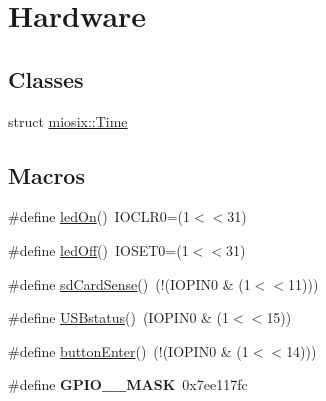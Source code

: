 \hypertarget{group___hardware}{\section{Hardware}
\label{group___hardware}
}
\subsection*{Classes}
\begin{DoxyCompactItemize}
\item 
struct \hyperlink{structmiosix_1_1_time}{miosix\-::\-Time}
\end{DoxyCompactItemize}
\subsection*{Macros}
\begin{DoxyCompactItemize}
\item 
\#define \hyperlink{group___hardware_ga7f802fb8b3e2bd4b837c798cb7baaede}{led\-On}()~I\-O\-C\-L\-R0=(1$<$$<$31)
\item 
\#define \hyperlink{group___hardware_ga53f74cd6a7d5774ef20ab95fcea03092}{led\-Off}()~I\-O\-S\-E\-T0=(1$<$$<$31)
\item 
\#define \hyperlink{group___hardware_ga52d3d285b9d92169c5a80480fa88b1eb}{sd\-Card\-Sense}()~(!(I\-O\-P\-I\-N0 \& (1$<$$<$11)))
\item 
\#define \hyperlink{group___hardware_ga4da6499c827570f986c91d87420ecb46}{U\-S\-Bstatus}()~(I\-O\-P\-I\-N0 \& (1$<$$<$15))
\item 
\#define \hyperlink{group___hardware_gad71ba85c3466ba5fd507f31185c50f66}{button\-Enter}()~(!(I\-O\-P\-I\-N0 \& (1$<$$<$14)))
\item 
\hypertarget{group___hardware_gad5fa15210c3870bf9c0579267e777c10}{\#define {\bfseries G\-P\-I\-O\-\_\-\_\-\-M\-A\-S\-K}~0x7ee117fc}\label{group___hardware_gad5fa15210c3870bf9c0579267e777c10}


\end{DoxyCompactItemize}
